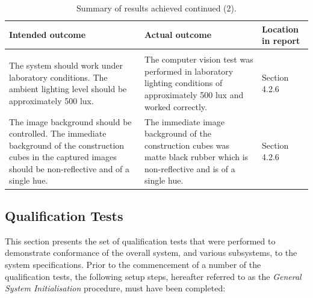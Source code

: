 \begin{table}[H]
	\renewcommand{\arraystretch}{1.3}
	\centering
	\begin{tabular}{|>{\raggedright}m{6cm}|>{\raggedright}m{6cm}|>{\raggedright\arraybackslash}m{2.2cm}|}
		\hline
		\textbf{Intended outcome} & \textbf{Actual outcome} & \textbf{Location in report} \\
		\hline
		\multicolumn{3}{|l|}{\textbf{Field condition requirements and specifications}} \\
		\hline
		The system should work under laboratory conditions. The ambient lighting level should be approximately 500 lux. & The computer vision test was performed in laboratory lighting conditions of approximately 500 lux and worked correctly. & Section 4.2.6 \\
		\hline
		The image background should be controlled. The immediate background of the construction cubes in the captured images should be non-reflective and of a single hue.& The immediate image background of the construction cubes was matte black rubber which is non-reflective and is of a single hue. & Section 4.2.6 \\
		\hline
	\end{tabular}
	\caption{\label{tab:results_summary_p3}Summary of results achieved continued (2).}
\end{table}

\subsection{Qualification Tests}

This section presents the set of qualification tests that were performed to demonstrate conformance of the overall system, and various subsystems, to the system specifications. Prior to the commencement of a number of the qualification tests, the following setup steps, hereafter referred to as the \textit{General System Initialisation} procedure, must have been completed:

